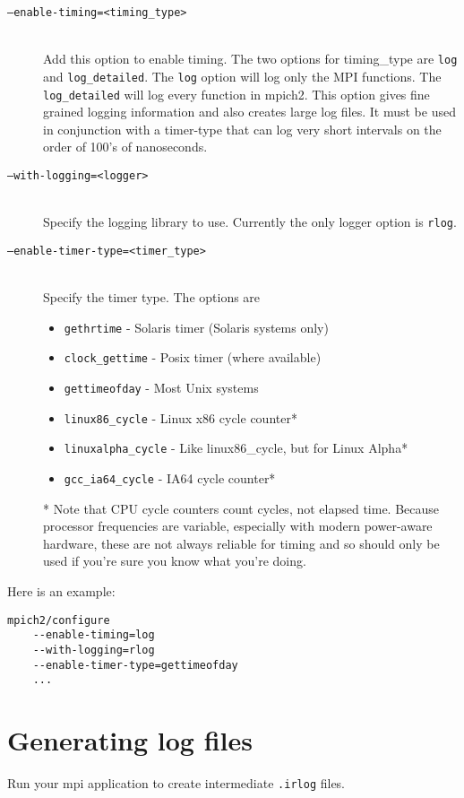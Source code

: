 \documentclass[dvipdfm,11pt]{article}
\begin{document}
\begin{description}
\item[\texttt{--enable-timing=<timing\_type>}]\mbox{}\\
Add this option to enable timing.  The two options for timing\_type are 
\texttt{log} and \texttt{log\_detailed}.  The \texttt{log} option will log 
only the MPI functions.  The 
\texttt{log\_detailed} will log every function in mpich2.  This option gives 
fine grained logging information and also creates large log files.  It must 
be used in conjunction with a timer-type that can log very short intervals 
on the order of 100's of nanoseconds.

\item[\texttt{--with-logging=<logger>}]\mbox{}\\
Specify the logging library to use.  Currently the only logger option is \texttt{rlog}.

\item[\texttt{--enable-timer-type=<timer\_type>}]\mbox{}\\
Specify the timer type.  The options are
\begin{itemize}
\item \texttt{gethrtime} -
Solaris timer (Solaris systems only)
\item \texttt{clock\_gettime} -
Posix timer (where available)
\item \texttt{gettimeofday} -
Most Unix systems
\item \texttt{linux86\_cycle} -
Linux x86 cycle counter*
\item \texttt{linuxalpha\_cycle} -
Like linux86\_cycle, but for Linux Alpha*
\item \texttt{gcc\_ia64\_cycle} -
IA64 cycle counter*
\end{itemize}
* Note that CPU cycle counters count cycles, not elapsed time.
Because processor frequencies are variable, especially with modern
power-aware hardware, these are not always reliable for timing and so
should only be used if you're sure you know what you're doing.

\end{description}

Here is an example:
\begin{verbatim}
mpich2/configure
    --enable-timing=log
    --with-logging=rlog
    --enable-timer-type=gettimeofday
    ...
\end{verbatim}

\section{Generating log files}
\label{sec:genlogs}
Run your mpi application to create intermediate \texttt{.irlog} files.
\end{document}
